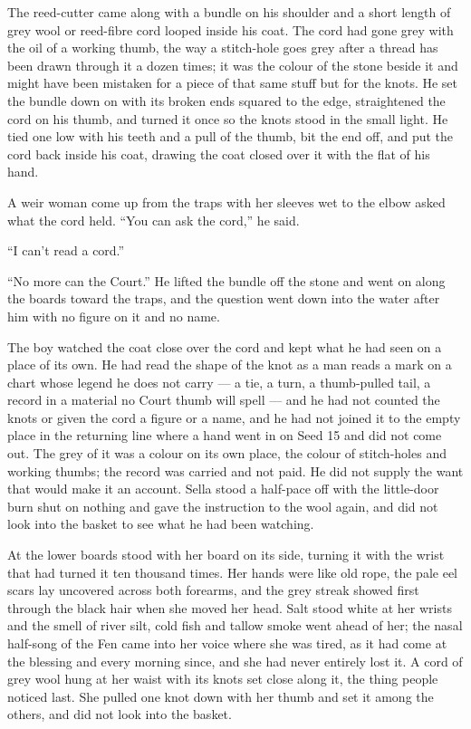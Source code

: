 The reed-cutter came along  with a bundle on his shoulder and a short length of grey wool or reed-fibre cord looped inside his coat. The cord had gone grey with the oil of a working thumb, the way a stitch-hole goes grey after a thread has been drawn through it a dozen times; it was the colour of the stone beside it and might have been mistaken for a piece of that same stuff but for the knots. He set the bundle down on  with its broken ends squared to the edge, straightened the cord on his thumb, and turned it once so the knots stood in the small light. He tied one low with his teeth and a pull of the thumb, bit the end off, and put the cord back inside his coat, drawing the coat closed over it with the flat of his hand.

A weir woman come up from the traps with her sleeves wet to the elbow asked what the cord held. “You can ask the cord,” he said.

“I can't read a cord.”

“No more can the Court.” He lifted the bundle off the stone and went on along the boards toward the traps, and the question went down into the water after him with no figure on it and no name.

The boy watched the coat close over the cord and kept what he had seen on a place of its own. He had read the shape of the knot as a man reads a mark on a chart whose legend he does not carry --- a tie, a turn, a thumb-pulled tail, a record in a material no Court thumb will spell --- and he had not counted the knots or given the cord a figure or a name, and he had not joined it to the empty place in the returning line where a hand went in on Seed 15 and did not come out. The grey of it was a colour on its own place, the colour of stitch-holes and working thumbs; the record was carried and not paid. He did not supply the want that would make it an account. Sella stood a half-pace off with the little-door burn shut on nothing and gave the instruction to the wool again, and did not look into the basket to see what he had been watching.

\scenebreak

At the lower boards  stood with her board on its side, turning it with the wrist that had turned it ten thousand times. Her hands were like old rope, the pale eel scars lay uncovered across both forearms, and the grey streak showed first through the black hair when she moved her head. Salt stood white at her wrists and the smell of river silt, cold fish and tallow smoke went ahead of her; the nasal half-song of the Fen came into her voice where she was tired, as it had come at the blessing and every morning since, and she had never entirely lost it. A cord of grey wool hung at her waist with its knots set close along it, the thing people noticed last. She pulled one knot down with her thumb and set it among the others, and did not look into the basket.


